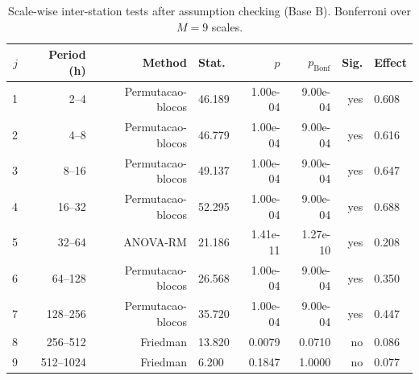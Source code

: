 \begin{table}[ht]
\centering
\caption{Scale-wise inter-station tests after assumption checking (Base B). Bonferroni over $M=9$ scales.}
\label{tab:tests}
\small
\begin{tabular}{rrrlrrrl}
\toprule
$j$ & Period (h) & Method & Stat. & $p$ & $p_{\mathrm{Bonf}}$ & Sig. & Effect \\
\midrule
1 & 2--4 & Permutacao-blocos & 46.189 & 1.00e-04 & 9.00e-04 & yes & 0.608 \\
2 & 4--8 & Permutacao-blocos & 46.779 & 1.00e-04 & 9.00e-04 & yes & 0.616 \\
3 & 8--16 & Permutacao-blocos & 49.137 & 1.00e-04 & 9.00e-04 & yes & 0.647 \\
4 & 16--32 & Permutacao-blocos & 52.295 & 1.00e-04 & 9.00e-04 & yes & 0.688 \\
5 & 32--64 & ANOVA-RM & 21.186 & 1.41e-11 & 1.27e-10 & yes & 0.208 \\
6 & 64--128 & Permutacao-blocos & 26.568 & 1.00e-04 & 9.00e-04 & yes & 0.350 \\
7 & 128--256 & Permutacao-blocos & 35.720 & 1.00e-04 & 9.00e-04 & yes & 0.447 \\
8 & 256--512 & Friedman & 13.820 & 0.0079 & 0.0710 & no & 0.086 \\
9 & 512--1024 & Friedman & 6.200 & 0.1847 & 1.0000 & no & 0.077 \\
\bottomrule
\end{tabular}
\end{table}
